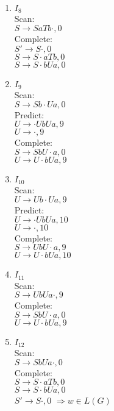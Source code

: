 \documentclass{article}
\begin{document}
\begin{enumerate}
		\item $I_8$\\
		Scan:\\
		$S \rightarrow  S aTb \cdot,0$\\
		Complete:\\		
		$S'\rightarrow S \cdot,0$\\
		$S \rightarrow S \cdot aTb,0$\\
		$S \rightarrow S \cdot bUa,0$\\
		
		\item $I_9$\\
		Scan:\\
		$S \rightarrow Sb \cdot Ua,0$\\
		Predict:\\
		$U \rightarrow \cdot UbUa, 9$\\
		$U \rightarrow \cdot, 9$\\
		Complete:\\
		$S \rightarrow SbU \cdot a, 0$\\
		$U \rightarrow U \cdot bUa, 9$\\
		
		\item $I_{10}$\\
		Scan:\\
		$U \rightarrow Ub \cdot Ua, 9$\\
		Predict:\\
		$U \rightarrow \cdot UbUa, 10$\\
		$U \rightarrow \cdot, 10$\\
		Complete:\\
		$S \rightarrow UbU \cdot a, 9$\\
		$U \rightarrow U \cdot bUa, 10$\\
		
		\item $I_{11}$\\
		Scan:\\		
		$S \rightarrow UbUa \cdot, 9$\\
		Complete:\\
		$S \rightarrow SbU \cdot a,0$\\
		$U \rightarrow U \cdot bUa, 9$\\
		
		\item $I_{12}$\\
		Scan:\\
		$S \rightarrow SbUa \cdot,0$\\
		Complete:\\
		$S \rightarrow  S \cdot aTb,0$\\
		$S \rightarrow S  \cdot bUa,0$\\
		$S' \rightarrow S \cdot, 0$ $\Rightarrow  w \in L(G)$ \\ 
		
		
		
		
		
		
		
		
		
	\end{enumerate}
\end{document}

